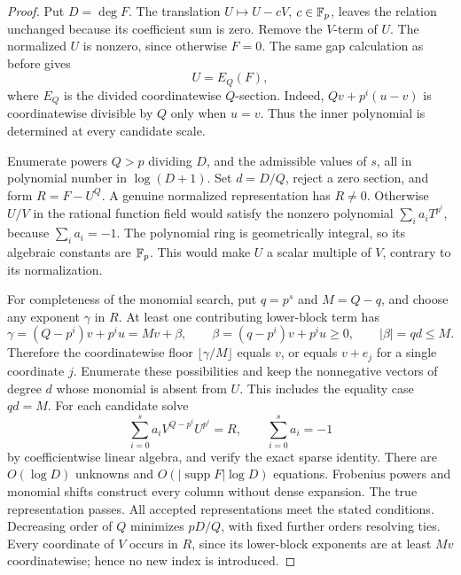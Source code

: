 \begin{proof}
Put $D=\deg F$. The translation $U\mapsto U-cV$, $c\in\mathbb F_p$,
leaves the relation unchanged because its coefficient sum is zero.
Remove the $V$-term of $U$. The normalized $U$ is nonzero, since
otherwise $F=0$. The same gap calculation as before gives
\[
 U=E_Q(F),
\]
where $E_Q$ is the divided coordinatewise $Q$-section. Indeed,
$Qv+p^i(u-v)$ is coordinatewise divisible by $Q$ only when $u=v$.
Thus the inner polynomial is determined at every candidate scale.

Enumerate powers $Q>p$ dividing $D$, and the admissible values of
$s$, all in polynomial number in $\log(D+1)$. Set $d=D/Q$, reject a
zero section, and form $R=F-U^Q$. A genuine normalized representation
has $R\ne0$. Otherwise $U/V$ in the rational function field would
satisfy the nonzero polynomial $\sum_i a_iT^{p^i}$, because
$\sum_i a_i=-1$. The polynomial ring is geometrically integral, so
its algebraic constants are $\mathbb F_p$. This would make $U$ a scalar
multiple of $V$, contrary to its normalization.

For completeness of the monomial search, put $q=p^s$ and $M=Q-q$,
and choose any exponent $\gamma$ in $R$. At least one contributing
lower-block term has
\[
 \gamma=(Q-p^i)v+p^iu
        =Mv+\beta,
 \qquad \beta=(q-p^i)v+p^iu\ge0,
 \qquad |\beta|=qd\le M.
\]
Therefore the coordinatewise floor $\lfloor\gamma/M\rfloor$ equals
$v$, or equals $v+e_j$ for a single coordinate $j$. Enumerate these
possibilities and keep the nonnegative vectors of degree $d$ whose
monomial is absent from $U$. This includes the equality case $qd=M$.
For each candidate solve
\[
 \sum_{i=0}^{s}a_iV^{Q-p^i}U^{p^i}=R,
 \qquad \sum_{i=0}^{s}a_i=-1
\]
by coefficientwise linear algebra, and verify the exact sparse identity.
There are $O(\log D)$ unknowns and
$O(|\operatorname{supp}F|\log D)$ equations. Frobenius powers and
monomial shifts construct every column without dense expansion.
The true representation passes. All accepted representations meet
the stated conditions. Decreasing order of $Q$ minimizes
$pD/Q$, with fixed further orders resolving ties. Every coordinate
of $V$ occurs in $R$, since its lower-block exponents are at least
$Mv$ coordinatewise; hence no new index is introduced.


\end{proof}
